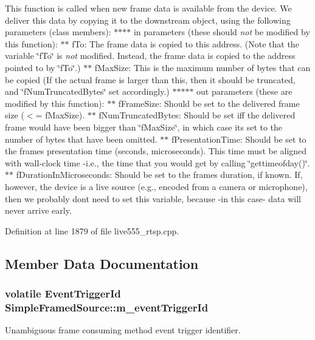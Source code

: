 This function is called when new frame data is available from the device. We deliver this data by copying it to the \textquotesingle{}downstream\textquotesingle{} object, using the following parameters (class members)\+: $\ast$$\ast$$\ast$$\ast$ \textquotesingle{}in\textquotesingle{} parameters (these should {\itshape not} be modified by this function)\+: $\ast$$\ast$ f\+To\+: The frame data is copied to this address. (Note that the variable \char`\"{}f\+To\char`\"{} is {\itshape not} modified. Instead, the frame data is copied to the address pointed to by \char`\"{}f\+To\char`\"{}.) $\ast$$\ast$ f\+Max\+Size\+: This is the maximum number of bytes that can be copied (If the actual frame is larger than this, then it should be truncated, and \char`\"{}f\+Num\+Truncated\+Bytes\char`\"{} set accordingly.) $\ast$$\ast$$\ast$$\ast$$\ast$ \textquotesingle{}out\textquotesingle{} parameters (these are modified by this function)\+: $\ast$$\ast$ f\+Frame\+Size\+: Should be set to the delivered frame size ($<$= f\+Max\+Size). $\ast$$\ast$ f\+Num\+Truncated\+Bytes\+: Should be set iff the delivered frame would have been bigger than \char`\"{}f\+Max\+Size\char`\"{}, in which case it\textquotesingle{}s set to the number of bytes that have been omitted. $\ast$$\ast$ f\+Presentation\+Time\+: Should be set to the frame\textquotesingle{}s presentation time (seconds, microseconds). This time must be aligned with \textquotesingle{}wall-\/clock time\textquotesingle{} -\/i.\+e., the time that you would get by calling \char`\"{}gettimeofday()\char`\"{}. $\ast$$\ast$ f\+Duration\+In\+Microseconds\+: Should be set to the frame\textquotesingle{}s duration, if known. If, however, the device is a \textquotesingle{}live source\textquotesingle{} (e.\+g., encoded from a camera or microphone), then we probably don\textquotesingle{}t need to set this variable, because -\/in this case-\/ data will never arrive \textquotesingle{}early\textquotesingle{}. 

Definition at line 1879 of file live555\+\_\+rtsp.\+cpp.



\subsection{Member Data Documentation}
\subsubsection[{\texorpdfstring{m\+\_\+event\+Trigger\+Id}{m_eventTriggerId}}]{\setlength{\rightskip}{0pt plus 5cm}volatile Event\+Trigger\+Id Simple\+Framed\+Source\+::m\+\_\+event\+Trigger\+Id}\hypertarget{classSimpleFramedSource_a6de7be242a550522e914316487fa112e}{}\label{classSimpleFramedSource_a6de7be242a550522e914316487fa112e}
Unambiguous frame consuming method event trigger identifier. 


